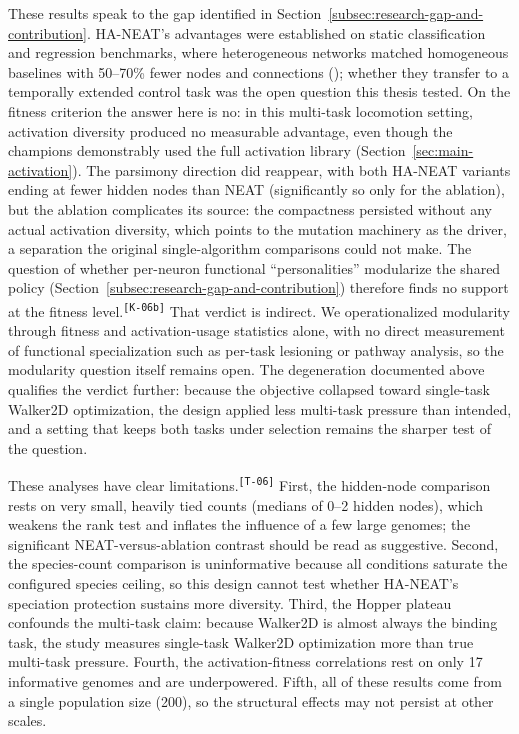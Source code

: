 \documentclass[12pt]{article}
\newcommand{\revID}[1]{\textsuperscript{\scriptsize\texttt{[#1]}}}
\newcommand{\revConsistency}[2]{\textcolor{revBlue}{#2}\revID{#1}}
\newcommand{\revStructure}[2]{\textcolor{revAmber}{#2}\revID{#1}}
\begin{document}
These results speak to the gap identified in Section~\ref{subsec:research-gap-and-contribution}.
HA-NEAT's advantages were established on static classification and regression benchmarks, where heterogeneous networks matched homogeneous baselines with 50--70\% fewer nodes and connections (\cite{hagg_evolving_2017}); whether they transfer to a temporally extended control task was the open question this thesis tested.
On the fitness criterion the answer here is no: in this multi-task locomotion setting, activation diversity produced no measurable advantage, even though the champions demonstrably used the full activation library (Section~\ref{sec:main-activation}).
The parsimony direction did reappear, with both HA-NEAT variants ending at fewer hidden nodes than NEAT (significantly so only for the ablation), but the ablation complicates its source: the compactness persisted without any actual activation diversity, which points to the mutation machinery as the driver, a separation the original single-algorithm comparisons could not make.
\revConsistency{K-06b}{The question of whether per-neuron functional ``personalities'' modularize the shared policy (Section~\ref{subsec:research-gap-and-contribution}) therefore finds no support at the fitness level.}
That verdict is indirect. We operationalized modularity through fitness and activation-usage statistics alone, with no direct measurement of functional specialization such as per-task lesioning or pathway analysis, so the modularity question itself remains open.
The degeneration documented above qualifies the verdict further: because the objective collapsed toward single-task Walker2D optimization, the design applied less multi-task pressure than intended, and a setting that keeps both tasks under selection remains the sharper test of the question.

\revStructure{T-06}{These analyses have clear limitations.}
First, the hidden-node comparison rests on very small, heavily tied counts (medians of 0--2 hidden nodes), which weakens the rank test and inflates the influence of a few large genomes; the significant NEAT-versus-ablation contrast should be read as suggestive.
Second, the species-count comparison is uninformative because all conditions saturate the configured species ceiling, so this design cannot test whether HA-NEAT's speciation protection sustains more diversity.
Third, the Hopper plateau confounds the multi-task claim: because Walker2D is almost always the binding task, the study measures single-task Walker2D optimization more than true multi-task pressure.
Fourth, the activation-fitness correlations rest on only 17 informative genomes and are underpowered.
Fifth, all of these results come from a single population size (200), so the structural effects may not persist at other scales.
\end{document}
